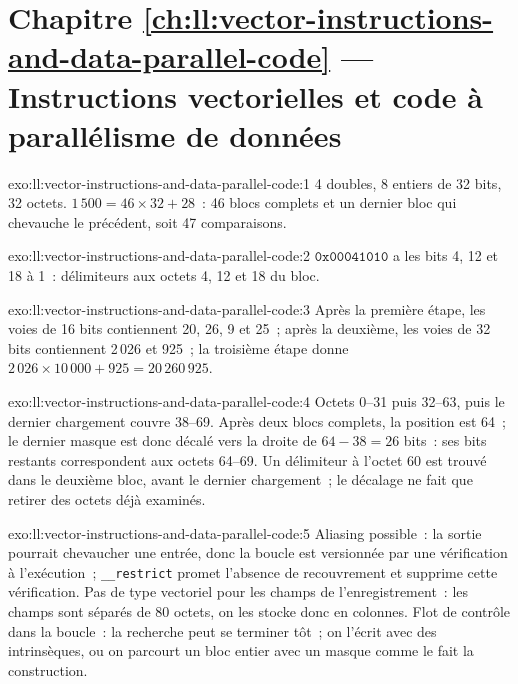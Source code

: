 \section*{Chapitre \ref{ch:ll:vector-instructions-and-data-parallel-code} --- Instructions vectorielles et code à parallélisme de données}

\begin{solution}{exo:ll:vector-instructions-and-data-parallel-code:1}
4 doubles, 8 entiers de 32 bits, 32 octets. $1\,500 = 46 \times 32 + 28$~: 46 blocs complets et un dernier bloc qui chevauche le précédent, soit 47
comparaisons.
\end{solution}

\begin{solution}{exo:ll:vector-instructions-and-data-parallel-code:2}
$\mathtt{0x00041010}$ a les bits 4, 12 et 18 à 1~: délimiteurs aux octets 4, 12 et 18 du bloc.
\end{solution}

\begin{solution}{exo:ll:vector-instructions-and-data-parallel-code:3}
Après la première étape, les voies de 16 bits contiennent 20, 26, 9 et 25~; après la deuxième, les voies de 32 bits contiennent 2\,026 et 925~;
la troisième étape donne $2\,026 \times 10\,000 + 925 = 20\,260\,925$.
\end{solution}

\begin{solution}{exo:ll:vector-instructions-and-data-parallel-code:4}
Octets 0--31 puis 32--63, puis le dernier chargement couvre 38--69. Après deux blocs complets, la position est 64~; le dernier masque est donc décalé
vers la droite de $64 - 38 = 26$ bits~: ses bits restants correspondent aux octets 64--69. Un délimiteur à l'octet 60 est trouvé dans le deuxième bloc,
avant le dernier chargement~; le décalage ne fait que retirer des octets déjà examinés.
\end{solution}

\begin{solution}{exo:ll:vector-instructions-and-data-parallel-code:5}
Aliasing possible~: la sortie pourrait chevaucher une entrée, donc la boucle est versionnée par une vérification à l'exécution~; \texttt{\_\_restrict}
promet l'absence de recouvrement et supprime cette vérification. Pas de type vectoriel pour les champs de l'enregistrement~: les champs sont séparés de 80 octets,
on les stocke donc en colonnes. Flot de contrôle dans la boucle~: la recherche peut se terminer tôt~; on l'écrit avec des intrinsèques, ou on parcourt
un bloc entier avec un masque comme le fait la construction.
\end{solution}

